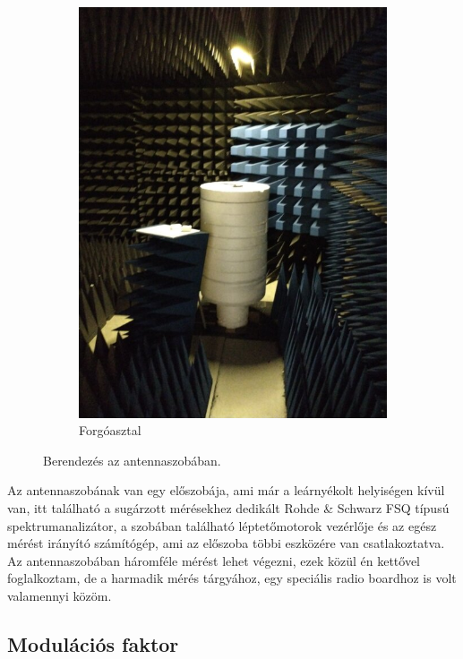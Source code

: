 \documentclass[a4paper,12pt,titlepage]{article}
\begin{document}
\begin{figure}
\begin{subfigure}{0.4\textwidth}
                    \includegraphics[width=\textwidth]{kep/szerkesztett/antennaszoba-asztal.jpg}
                    \caption{Forgóasztal}
                \end{subfigure}
                \caption{Berendezés az antennaszobában.}
                \label{fig:antennaszoba}
            \end{figure}
            \par
            Az antennaszobának van egy előszobája, ami már a leárnyékolt helyiségen kívül van, itt található a sugárzott mérésekhez dedikált Rohde \& Schwarz FSQ típusú spektrumanalizátor, a szobában található léptetőmotorok vezérlője és az egész mérést irányító számítógép, ami az előszoba többi eszközére van csatlakoztatva. Az antennaszobában háromféle mérést lehet végezni, ezek közül én kettővel foglalkoztam, de a harmadik mérés tárgyához, egy speciális radio boardhoz is volt valamennyi közöm.
        \subsection{Modulációs faktor}
\end{document}
